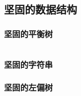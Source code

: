 \documentclass[landscape, twoside, a4paper]{article}
\newcommand{\cppcode}[1]{
	\inputminted[mathescape,
	frame=lines,linenos]{cpp}{source/#1}
}
\begin{document}
\begin{multicols}{2}
\begin{spacing}{0.8}
\cppcode{data-structure/Treap.cpp}






\subsection{坚固的数据结构}






\subsubsection{坚固的平衡树}


\cppcode{data-structure/fhqTreap.cpp}


\subsubsection{坚固的字符串}









\subsubsection{坚固的左偏树}

\cppcode{data-structure/lefttree.cpp}






\end{spacing}
\end{multicols}
\end{document}
